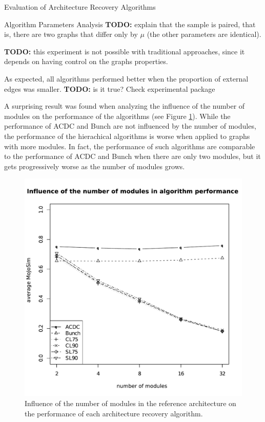 \documentclass[11pt,twocolumn,a4paper,english]{article}
\newcommand{\TODO}{\textbf{TODO:} }
\begin{document}
\begin{section}{Evaluation of Architecture Recovery Algorithms}
\begin{subsection}{Algorithm Parameters Analysis}
	\TODO explain that the sample is paired, that is, there are two graphs that differ only by $\mu$ (the other parameters are identical).
	
	\TODO this experiment is not possible with traditional approaches, since it depends on having control on the graphs properties.
	
	As expected, all algorithms performed better when the proportion of external edges was smaller. \TODO is it true? Check experimental package
	
	A surprising result was found when analyzing the influence of the number of modules on the performance of the algorithms (see Figure \ref{fig:exp-number-modules}). While the performance of ACDC and Bunch are not influenced by the number of modules, the performance of the hierachical algorithms is worse when applied to graphs with more modules. In fact, the performance of such algorithms are comparable to the performance of ACDC and Bunch when there are only two modules, but it gets  progressively worse as the number of modules grows.
	
	\begin{figure}[htbp]
		\centering
			\includegraphics[scale=0.5]{figures/exp-number-modules}
		\caption{Influence of the number of modules in the reference architecture on the performance of each architecture recovery algorithm.}
		\label{fig:exp-number-modules}
	\end{figure}
	

\end{subsection}
\end{section}
\end{document}
